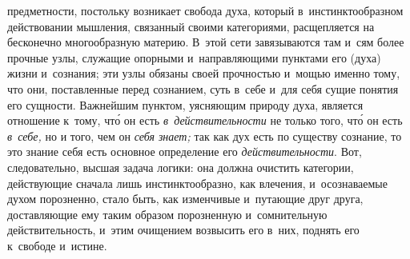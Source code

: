 предметности, постольку возникает свобода духа, который в~инстинктообразном
действовании мышления, связанный своими категориями, расщепляется на бесконечно
многообразную материю. В~этой сети завязываются там и~сям более прочные узлы,
служащие опорными и~направляющими пунктами его (духа) жизни и~сознания; эти
узлы обязаны своей прочностью и~мощью именно тому, что они, поставленные перед
сознанием, суть в~себе и~для себя сущие понятия его сущности. Важнейшим
пунктом, уясняющим природу духа, является отношение к~тому, чт\'{о} он есть
{\em в~действительности} не только того, чт\'{о} он есть {\em в~себе,} но и
того, чем он {\em себя знает;} так как дух есть по существу сознание, то это
знание себя есть основное определение его {\em действительности}. Вот,
следовательно, высшая задача логики: она должна очистить категории, действующие
сначала лишь инстинктообразно, как влечения, и~осознаваемые духом порозненно,
стало быть, как изменчивые и~путающие друг друга, доставляющие ему таким
образом порозненную и~сомнительную действительность, и~этим очищением возвысить
его в~них, поднять его к~свободе и~истине.

